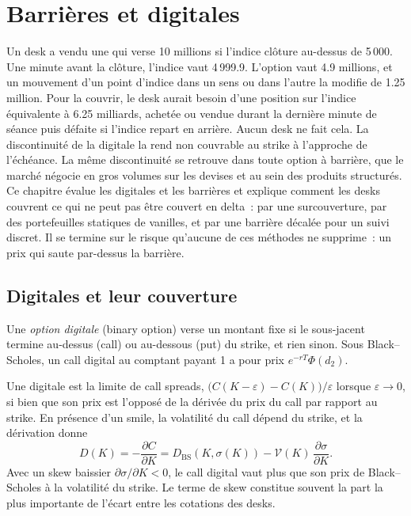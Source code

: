 \chapter{Barrières et digitales}\label{ch:dv:barriers-and-digitals}

Un desk a vendu une  qui verse 10 millions si l'indice clôture au-dessus de 5\,000. Une minute avant
la clôture, l'indice vaut 4\,999.9. L'option vaut 4.9 millions, et un mouvement d'un point d'indice dans un sens
ou dans l'autre la modifie de 1.25 million. Pour la couvrir, le desk aurait besoin d'une position sur l'indice
équivalente à 6.25 milliards, achetée ou vendue durant la dernière minute de séance puis défaite si l'indice
repart en arrière. Aucun desk ne fait cela. La discontinuité de la digitale la rend non couvrable au strike à
l'approche de l'échéance. La même discontinuité se retrouve dans toute option à barrière, que le marché négocie en gros
volumes sur les devises et au sein des produits structurés. Ce chapitre évalue les digitales et les barrières et explique
comment les desks couvrent ce qui ne peut pas être couvert en delta~: par une surcouverture, par des portefeuilles
statiques de vanilles, et par une barrière décalée pour un suivi discret. Il se termine sur le risque qu'aucune de ces méthodes ne supprime~: un prix qui saute par-dessus la barrière.

\section{Digitales et leur couverture}

\begin{definition}\label{def:dv:barriers-and-digitals:digital}
Une \emph{option digitale} (binary option) verse un montant fixe si le sous-jacent termine au-dessus
(call) ou au-dessous (put) du strike, et rien sinon. Sous Black--Scholes, un call digital au comptant payant 1 a pour prix
$e^{-rT}\Phi(d_2)$.
\end{definition}

Une digitale est la limite de call spreads, $\bigl(C(K-\varepsilon)-C(K)\bigr)/\varepsilon$ lorsque $\varepsilon\to0$,
si bien que son prix est l'opposé de la dérivée du prix du call par rapport au strike. En présence d'un smile, la volatilité du call dépend du
strike, et la dérivation donne
\[
D(K)=-\frac{\partial C}{\partial K}=D_{\mathrm{BS}}(K,\sigma(K))-\mathcal V(K)\,\frac{\partial\sigma}{\partial K}.
\]
Avec un skew baissier $\partial\sigma/\partial K<0$, le call digital vaut plus que son prix de Black--Scholes à la
volatilité du strike. Le terme de skew constitue souvent la part la plus importante de l'écart entre les cotations des desks.

